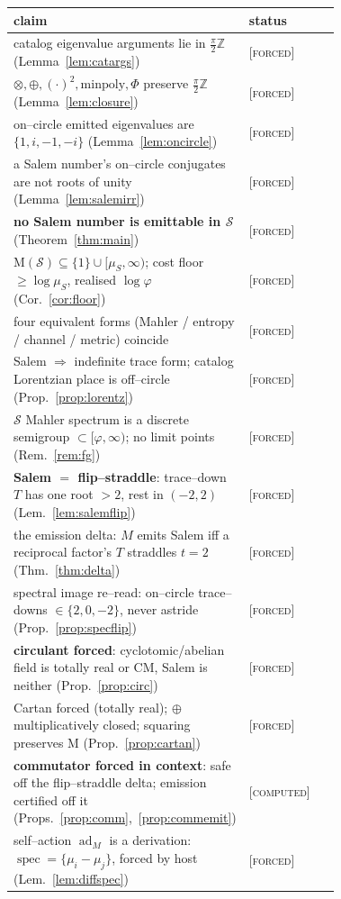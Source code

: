 \documentclass[11pt]{article}
\theoremstyle{plain}
\theoremstyle{definition}
\theoremstyle{remark}
\newcommand{\forced}{\textcolor{forcedc}{\textsc{[forced]}}}
\newcommand{\computed}{\textcolor{forcedc}{\textsc{[computed]}}}
\newcommand{\Z}{\mathbb{Z}}
\newcommand{\Mah}{\mathrm{M}}
\newcommand{\Scal}{\mathcal{S}}
\begin{document}
\begin{center}
\renewcommand{\arraystretch}{1.3}
\begin{tabular}{@{}p{0.72\linewidth}l@{}}
\toprule
claim & status \\
\midrule
catalog eigenvalue arguments lie in $\tfrac\pi2\Z$ (Lemma~\ref{lem:catargs}) & \forced \\
$\otimes,\oplus,(\cdot)^2,\mathrm{minpoly},\Phi$ preserve $\tfrac\pi2\Z$ (Lemma~\ref{lem:closure}) & \forced \\
on--circle emitted eigenvalues are $\{1,i,-1,-i\}$ (Lemma~\ref{lem:oncircle}) & \forced \\
a Salem number's on--circle conjugates are not roots of unity (Lemma~\ref{lem:salemirr}) & \forced \\
\textbf{no Salem number is emittable in $\Scal$} (Theorem~\ref{thm:main}) & \forced \\
$\Mah(\Scal)\subseteq\{1\}\cup[\mu_S,\infty)$; cost floor $\ge\log\mu_S$, realised $\log\varphi$ (Cor.~\ref{cor:floor}) & \forced \\
four equivalent forms (Mahler / entropy / channel / metric) coincide & \forced \\
Salem $\Rightarrow$ indefinite trace form; catalog Lorentzian place is off--circle (Prop.~\ref{prop:lorentz}) & \forced \\
$\Scal$ Mahler spectrum is a discrete semigroup $\subset[\varphi,\infty)$; no limit points (Rem.~\ref{rem:fg}) & \forced \\
\midrule
\textbf{Salem $=$ flip--straddle}: trace--down $T$ has one root $>2$, rest in $(-2,2)$ (Lem.~\ref{lem:salemflip}) & \forced \\
the emission delta: $M$ emits Salem iff a reciprocal factor's $T$ straddles $t=2$ (Thm.~\ref{thm:delta}) & \forced \\
spectral image re--read: on--circle trace--downs $\in\{2,0,-2\}$, never astride (Prop.~\ref{prop:specflip}) & \forced \\
\textbf{circulant forced}: cyclotomic/abelian field is totally real or CM, Salem is neither (Prop.~\ref{prop:circ}) & \forced \\
Cartan forced (totally real); $\oplus$ multiplicatively closed; squaring preserves $\Mah$ (Prop.~\ref{prop:cartan}) & \forced \\
\textbf{commutator forced in context}: safe off the flip--straddle delta; emission certified off it (Props.~\ref{prop:comm},~\ref{prop:commemit}) & \computed \\
\midrule
self--action $\operatorname{ad}_M$ is a derivation: $\operatorname{spec}=\{\mu_i-\mu_j\}$, forced by host (Lem.~\ref{lem:diffspec}) & \forced \\

\end{tabular}
\end{center}
\end{document}
